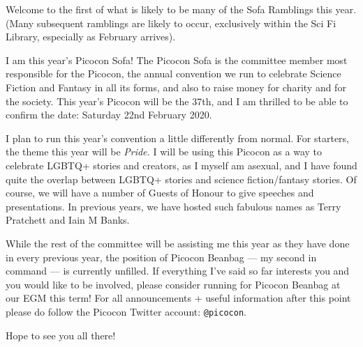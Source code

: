 Welcome to the first of what is likely to be many of the Sofa
Ramblings\texttrademark{} this year. (Many subsequent ramblings are
likely to occur, exclusively within the Sci Fi Library, especially as
February arrives).

I am this year’s Picocon Sofa! The Picocon Sofa is the committee
member most responsible for the Picocon, the annual convention we run
to celebrate Science Fiction and Fantasy in all its forms, and also to
raise money for charity and for the society.  This year’s Picocon will
be the 37th, and I am thrilled to be able to confirm the date:
Saturday 22nd February 2020.

I plan to run this year’s convention a little differently from
normal. For starters, the theme this year will be \emph{Pride.} I will
be using this Picocon as a way to celebrate LGBTQ+ stories and
creators, as I myself am asexual, and I have found quite the overlap
between LGBTQ+ stories and science fiction/fantasy stories. Of course,
we will have a number of Guests of Honour to give speeches and
presentations. In previous years, we have hosted such fabulous names
as Terry Pratchett and Iain M Banks.

While the rest of the committee will be assisting me this year as they
have done in every previous year, the position of Picocon Beanbag ---
my second in command --- is currently unfilled. If everything I’ve
said so far interests you and you would like to be involved, please
consider running for Picocon Beanbag at our EGM this term! For all
announcements + useful information after this point please do follow
the Picocon Twitter account: \texttt{@picocon}.

Hope to see you all there!
